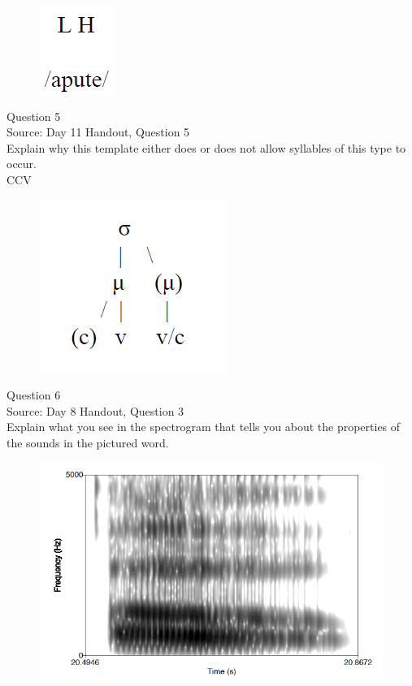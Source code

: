 \documentclass[12pt]{article}
\begin{document}
\begin{figure}[H]
\includegraphics{../images/mendetone_c.png}
\end{figure}

\newpage

{\large Question 5}\\

Source: Day 11 Handout, Question 5\\

Explain why this template either does or does not allow syllables of this type to occur.\\

CCV

\begin{figure}[H]
\includegraphics{../images/ponapean_syllabletemplate.png}
\end{figure}

\newpage

{\large Question 6}\\

Source: Day 8 Handout, Question 3\\

Explain what you see in the spectrogram that tells you about the properties of the sounds in the pictured word.\\

\begin{figure}[H]
\includegraphics{../images/spectrogram_oh.png}
\end{figure}
\end{document}
